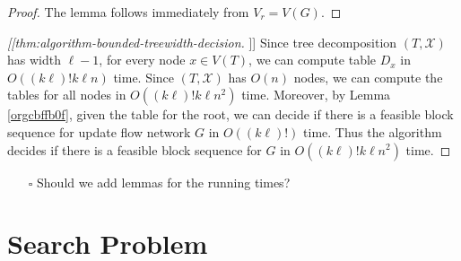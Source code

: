 \documentclass[fontsize=11pt,paper=a4]{book}
\begin{document}
\begin{proof}
The lemma follows immediately from \(V_r=V(G)\).
\end{proof}

\begin{proof}[[[thm:algorithm-bounded-treewidth-decision]]]
Since tree decomposition \((T,\mathcal{X})\) has width \(\ell-1\), for every node \(x\in V(T)\), we can compute table \(D_x\) in \(O((k\ell)!k\ell n)\) time.
Since \((T,\mathcal{X})\) has \(O(n)\) nodes, we can compute the tables for all nodes in \(O((k\ell)!k\ell n^2)\) time.
Moreover, by Lemma \ref{orgcbffb0f}, given the table for the root, we can decide if there is a feasible block sequence for update flow network \(G\) in \(O((k\ell)!)\) time.
Thus the algorithm decides if there is a feasible block sequence for \(G\) in \(O((k\ell)!k\ell n^2)\) time.
\end{proof}

\begin{itemize}
\item[{$\square$}] Should we add lemmas for the running times?
\end{itemize}

\chapter{Search Problem}
\label{sec:org94a7f20}
\end{document}
